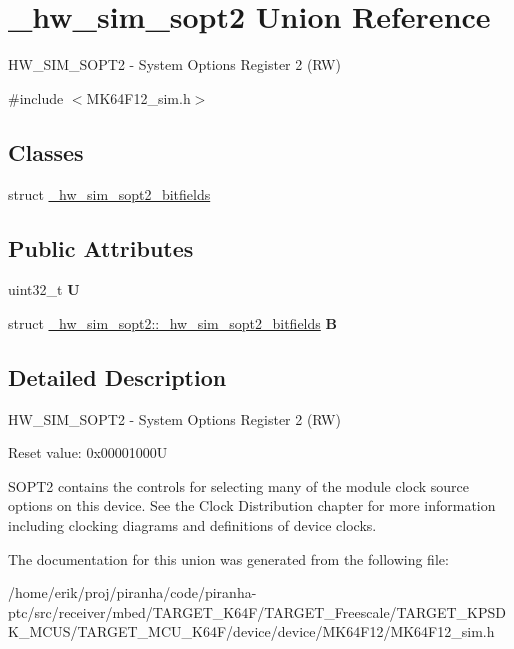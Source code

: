 \hypertarget{union__hw__sim__sopt2}{}\section{\+\_\+hw\+\_\+sim\+\_\+sopt2 Union Reference}
\label{union__hw__sim__sopt2}


H\+W\+\_\+\+S\+I\+M\+\_\+\+S\+O\+P\+T2 -\/ System Options Register 2 (RW)  




{\ttfamily \#include $<$M\+K64\+F12\+\_\+sim.\+h$>$}

\subsection*{Classes}
\begin{DoxyCompactItemize}
\item 
struct \hyperlink{struct__hw__sim__sopt2_1_1__hw__sim__sopt2__bitfields}{\+\_\+hw\+\_\+sim\+\_\+sopt2\+\_\+bitfields}
\end{DoxyCompactItemize}
\subsection*{Public Attributes}
\begin{DoxyCompactItemize}
\item 
uint32\+\_\+t {\bfseries U}\hypertarget{union__hw__sim__sopt2_a0dd841dbc28a3c8e491cc64645d7e977}{}\label{union__hw__sim__sopt2_a0dd841dbc28a3c8e491cc64645d7e977}

\item 
struct \hyperlink{struct__hw__sim__sopt2_1_1__hw__sim__sopt2__bitfields}{\+\_\+hw\+\_\+sim\+\_\+sopt2\+::\+\_\+hw\+\_\+sim\+\_\+sopt2\+\_\+bitfields} {\bfseries B}\hypertarget{union__hw__sim__sopt2_a182ab302db2a24c12d56e6d37fbebca0}{}\label{union__hw__sim__sopt2_a182ab302db2a24c12d56e6d37fbebca0}

\end{DoxyCompactItemize}


\subsection{Detailed Description}
H\+W\+\_\+\+S\+I\+M\+\_\+\+S\+O\+P\+T2 -\/ System Options Register 2 (RW) 

Reset value\+: 0x00001000U

S\+O\+P\+T2 contains the controls for selecting many of the module clock source options on this device. See the Clock Distribution chapter for more information including clocking diagrams and definitions of device clocks. 

The documentation for this union was generated from the following file\+:\begin{DoxyCompactItemize}
\item 
/home/erik/proj/piranha/code/piranha-\/ptc/src/receiver/mbed/\+T\+A\+R\+G\+E\+T\+\_\+\+K64\+F/\+T\+A\+R\+G\+E\+T\+\_\+\+Freescale/\+T\+A\+R\+G\+E\+T\+\_\+\+K\+P\+S\+D\+K\+\_\+\+M\+C\+U\+S/\+T\+A\+R\+G\+E\+T\+\_\+\+M\+C\+U\+\_\+\+K64\+F/device/device/\+M\+K64\+F12/M\+K64\+F12\+\_\+sim.\+h\end{DoxyCompactItemize}

